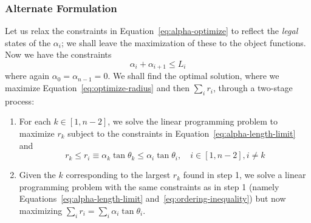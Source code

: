\documentclass{article}
\begin{document}
\subsubsection{Alternate Formulation}
\label{sec:alt-form}
%
Let us relax the constraints in Equation~\eqref{eq:alpha-optimize} to reflect the \emph{legal} states of the $\alpha_i$; we shall leave the maximization of these to the object functions.  Now we have the constraints
%
\begin{equation}
  \label{eq:alpha-length-limit}
  \alpha_i + \alpha_{i+1} \le L_i
\end{equation}
%
where again $\alpha_0 = \alpha_{n-1} = 0$.  We shall find the optimal solution, where we maximize Equation~\eqref{eq:optimize-radius} and then $\sum_i r_i$, through a two-stage process:
%
\begin{enumerate}
\item For each $k\in [1,n-2]$, we solve the linear programming problem to maximize $r_k$ subject to the constraints in Equation~\eqref{eq:alpha-length-limit} and
  \begin{equation}
    \label{eq:ordering-inequality}
    r_k \le r_i \equiv \alpha_k \tan \theta_k \le \alpha_i \tan \theta_i, \quad i \in [1,n-2], i \ne k
  \end{equation}
\item Given the $k$ corresponding to the largest $r_k$ found in step 1, we solve a linear programming problem with the same constraints as in step 1 (namely Equations~\eqref{eq:alpha-length-limit} and~\eqref{eq:ordering-inequality}) but now maximizing $\sum_i r_i = \sum_i \alpha_i \tan \theta_i$.
\end{enumerate}
%
\end{document}
